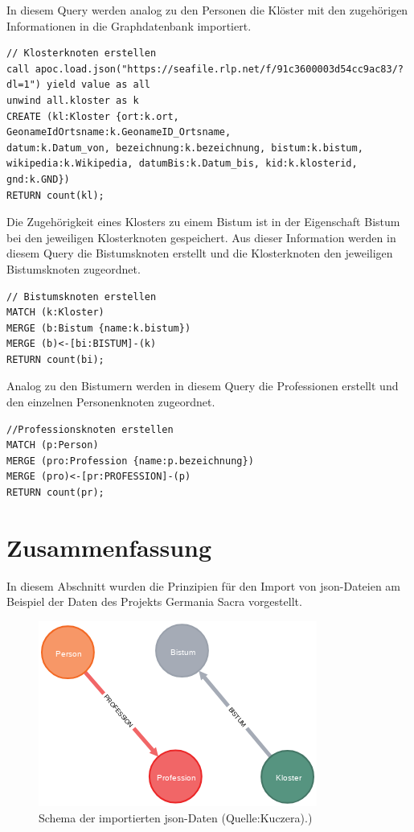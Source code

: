 \documentclass[ngerman,]{scrreprt}
\begin{document}
In diesem Query werden analog zu den Personen die Klöster mit den zugehörigen Informationen in die Graphdatenbank importiert.

\begin{verbatim}
// Klosterknoten erstellen
call apoc.load.json("https://seafile.rlp.net/f/91c3600003d54cc9ac83/?dl=1") yield value as all
unwind all.kloster as k
CREATE (kl:Kloster {ort:k.ort,
GeonameIdOrtsname:k.GeonameID_Ortsname,
datum:k.Datum_von, bezeichnung:k.bezeichnung, bistum:k.bistum,
wikipedia:k.Wikipedia, datumBis:k.Datum_bis, kid:k.klosterid, gnd:k.GND})
RETURN count(kl);
\end{verbatim}

Die Zugehörigkeit eines Klosters zu einem Bistum ist in der Eigenschaft Bistum bei den jeweiligen Klosterknoten gespeichert. Aus dieser Information werden in diesem Query die Bistumsknoten erstellt und die Klosterknoten den jeweiligen Bistumsknoten zugeordnet.

\begin{verbatim}
// Bistumsknoten erstellen
MATCH (k:Kloster)
MERGE (b:Bistum {name:k.bistum})
MERGE (b)<-[bi:BISTUM]-(k)
RETURN count(bi);
\end{verbatim}

Analog zu den Bistumern werden in diesem Query die Professionen erstellt und den einzelnen Personenknoten zugeordnet.

\begin{verbatim}
//Professionsknoten erstellen
MATCH (p:Person)
MERGE (pro:Profession {name:p.bezeichnung})
MERGE (pro)<-[pr:PROFESSION]-(p)
RETURN count(pr);
\end{verbatim}

\section{Zusammenfassung}\label{zusammenfassung-6}

In diesem Abschnitt wurden die Prinzipien für den Import von json-Dateien am Beispiel der Daten des Projekts Germania Sacra vorgestellt.

\begin{figure}
\centering
\includegraphics{Bilder/GS-Schema1.png}
\caption{Schema der importierten json-Daten (Quelle:Kuczera).)}
\end{figure}
\end{document}

